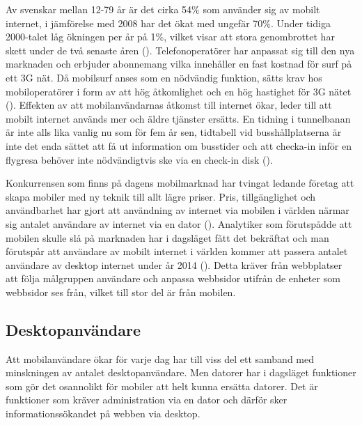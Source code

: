 \documentclass[11pt]{article}
\begin{document}
Av svenskar mellan 12-79 år är det cirka 54\% som använder sig av mobilt internet, i jämförelse med 2008 har det ökat med ungefär 70\%. Under tidiga 2000-talet låg ökningen per år på 1\%, vilket visar att stora genombrottet har skett under de två senaste åren (\cite[s. 24]{.se}). Telefonoperatörer har anpassat sig till den nya marknaden och erbjuder abonnemang vilka innehåller en fast kostnad för surf på ett 3G nät. Då mobilsurf anses som en nödvändig funktion, sätts krav hos mobiloperatörer i form av att hög åtkomlighet och en hög hastighet för 3G nätet (\cite[s. 17]{Cfigroup_2009}). Effekten av att mobilanvändarnas åtkomst till internet ökar, leder till att mobilt internet används mer och äldre tjänster ersätts. En tidning i tunnelbanan är inte alls lika vanlig nu som för fem år sen, tidtabell vid busshållplatserna är inte det enda sättet att få ut information om busstider och att checka-in inför en flygresa behöver inte nödvändigtvis ske via en check-in disk (\cite{kpcb}).

Konkurrensen som finns på dagens mobilmarknad har tvingat ledande företag att skapa mobiler med ny teknik till allt lägre priser. Pris, tillgänglighet och användbarhet har gjort att användning av internet via mobilen i världen närmar sig antalet användare av internet via en dator (\cite{morganstanley}). Analytiker som förutspådde att mobilen skulle slå på marknaden har i dagsläget fått det bekräftat och man förutspår att användare av mobilt internet i världen kommer att passera antalet användare av desktop internet under år 2014 (\cite{morganstanley}). Detta kräver från webbplatser att följa målgruppen användare och anpassa webbsidor utifrån de enheter som webbsidor ses från, vilket till stor del är från mobilen.

\subsection{Desktopanvändare}
Att mobilanvändare ökar för varje dag har till viss del ett samband med minskningen av antalet desktopanvändare. Men datorer har i dagsläget funktioner som gör det osannolikt för mobiler att helt kunna ersätta datorer. Det är funktioner som kräver administration via en dator och därför sker informationssökandet på webben via desktop. 
\end{document}
